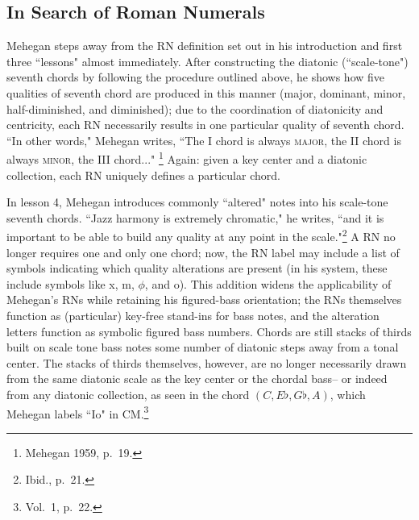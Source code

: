 \subsection{In Search of Roman Numerals}
Mehegan steps away from the RN definition set out in his introduction and first three ``lessons" almost immediately.  After constructing the diatonic (``scale-tone") seventh chords by following the procedure outlined above, he shows how five qualities of seventh chord are produced in this manner (major, dominant, minor, half-diminished, and diminished); due to the coordination of diatonicity and centricity, each RN necessarily results in one particular quality of seventh chord.  ``In other words," Mehegan writes, ``The I chord is always \textsc{major}, the II chord is always \textsc{minor}, the III chord..." \footnote{Mehegan 1959, p.\ 19.}  Again: given a key center and a diatonic collection, each RN uniquely defines a particular chord.

In lesson 4, Mehegan introduces commonly ``altered" notes into his scale-tone seventh chords.  ``Jazz harmony is extremely chromatic," he writes, ``and it is important to be able to build any quality at any point in the scale."\footnote{Ibid., p.\ 21.}  A RN no longer requires one and only one chord; now, the RN label may include a list of symbols indicating which quality alterations are present (in his system, these include symbols like x, m, $\phi$, and o).  This addition widens the applicability of Mehegan's RNs while retaining his figured-bass orientation; the RNs themselves function as (particular) key-free stand-ins for bass notes, and the alteration letters function as symbolic figured bass numbers.  Chords are still stacks of thirds built on scale tone bass notes some number of diatonic steps away from a tonal center.  The stacks of thirds themselves, however, are no longer necessarily drawn from the same diatonic scale as the key center or the chordal bass-- or indeed from any diatonic collection, as seen in the chord $(C,E\flat,G\flat,A)$, which Mehegan labels ``Io" in CM.\footnote{Vol.\ 1, p.\ 22.}

